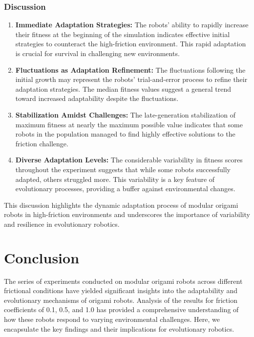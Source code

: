 \documentclass{sigchi}
\begin{document}
\subsubsection{Discussion}
\begin{enumerate}
    \item \textbf{Immediate Adaptation Strategies:} The robots' ability to rapidly increase their fitness at the beginning of the simulation indicates effective initial strategies to counteract the high-friction environment. This rapid adaptation is crucial for survival in challenging new environments.
    
    \item \textbf{Fluctuations as Adaptation Refinement:} The fluctuations following the initial growth may represent the robots' trial-and-error process to refine their adaptation strategies. The median fitness values suggest a general trend toward increased adaptability despite the fluctuations.
    
    \item \textbf{Stabilization Amidst Challenges:} The late-generation stabilization of maximum fitness at nearly the maximum possible value  indicates that some robots in the population managed to find highly effective solutions to the friction challenge.
    
    \item \textbf{Diverse Adaptation Levels:} The considerable variability in fitness scores throughout the experiment suggests that while some robots successfully adapted, others struggled more. This variability is a key feature of evolutionary processes, providing a buffer against environmental changes.
\end{enumerate}

This discussion highlights the dynamic adaptation process of modular origami robots in high-friction environments and underscores the importance of variability and resilience in evolutionary robotics.


\section{Conclusion}

The series of experiments conducted on modular origami robots across different frictional conditions have yielded significant insights into the adaptability and evolutionary mechanisms of origami robots. Analysis of the results for friction coefficients of 0.1, 0.5, and 1.0 has provided a comprehensive understanding of how these robots respond to varying environmental challenges. Here, we encapsulate the key findings and their implications for evolutionary robotics.
\end{document}
